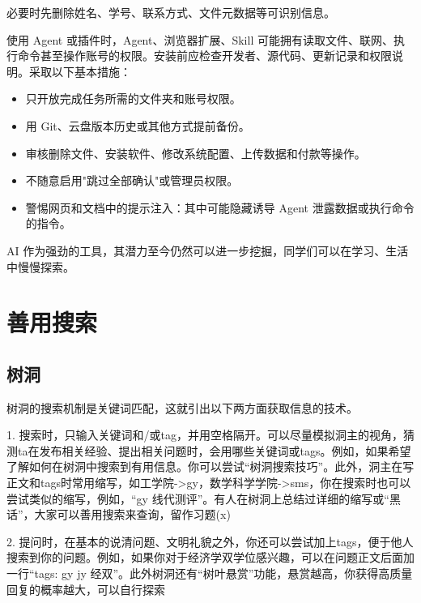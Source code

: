 \documentclass[11pt,oneside]{book}
\begin{document}
必要时先删除姓名、学号、联系方式、文件元数据等可识别信息。

使用 Agent 或插件时，Agent、浏览器扩展、Skill 可能拥有读取文件、联网、执行命令甚至操作账号的权限。安装前应检查开发者、源代码、更新记录和权限说明。采取以下基本措施：

\begin{itemize}
    \item 只开放完成任务所需的文件夹和账号权限。
    \item 用 Git、云盘版本历史或其他方式提前备份。
    \item 审核删除文件、安装软件、修改系统配置、上传数据和付款等操作。
    \item 不随意启用"跳过全部确认"或管理员权限。
    \item 警惕网页和文档中的提示注入：其中可能隐藏诱导 Agent 泄露数据或执行命令的指令。
\end{itemize}

\vspace{10pt}

AI 作为强劲的工具，其潜力至今仍然可以进一步挖掘，同学们可以在学习、生活中慢慢探索。

\section{善用搜索}
\subsection{树洞}

\vspace{10pt}
树洞的搜索机制是关键词匹配，这就引出以下两方面获取信息的技术。

\vspace{10pt}
1. 搜索时，只输入关键词和/或tag，并用空格隔开。可以尽量模拟洞主的视角，猜测ta在发布相关经验、提出相关问题时，会用哪些关键词或tags。例如，如果希望了解如何在树洞中搜索到有用信息。你可以尝试“树洞\enspace 搜索\enspace 技巧”。此外，洞主在写正文和tags时常用缩写，如工学院->gy，数学科学学院->sms，你在搜索时也可以尝试类似的缩写，例如，“gy 线代\enspace 测评”。有人在树洞上总结过详细的缩写或“黑话”，大家可以善用搜索来查询，留作习题(x)

\vspace{10pt}

2. 提问时，在基本的说清问题、文明礼貌之外，你还可以尝试加上tags，便于他人搜索到你的问题。例如，如果你对于经济学双学位感兴趣，可以在问题正文后面加一行“tags: gy jy 经双”。此外树洞还有“树叶悬赏”功能，悬赏越高，你获得高质量回复的概率越大，可以自行探索~
\end{document}
